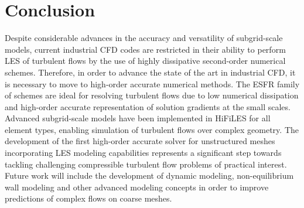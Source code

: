 
\section{Conclusion}
\label{sec:conclusion}

Despite considerable advances in the accuracy and versatility of subgrid-scale models, current industrial CFD codes are restricted in their ability to perform LES of turbulent flows by the use of highly dissipative second-order numerical schemes.
Therefore, in order to advance the state of the art in industrial CFD, it is necessary to move to high-order accurate numerical methods.
The ESFR family of schemes are ideal for resolving turbulent flows due to low numerical dissipation and high-order accurate representation of solution gradients at the small scales.
Advanced subgrid-scale models have been implemented in HiFiLES for all element types, enabling simulation of turbulent flows over complex geometry.
The development of the first high-order accurate solver for unstructured meshes incorporating LES modeling capabilities represents a significant step towards tackling challenging compressible turbulent flow problems of practical interest.
Future work will include the development of dynamic modeling, non-equilibrium wall modeling and other advanced modeling concepts in order to improve predictions of complex flows on coarse meshes.